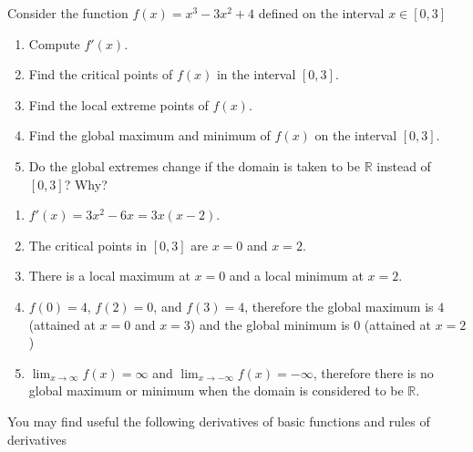 \documentclass[11pt]{exam}
\begin{document}
\begin{questions}


\question[4]
    Consider the function $f(x) = x^3 - 3x^2 + 4$ defined on the interval $x \in [0, 3]$
    \begin{enumerate}[leftmargin = 0.5cm, label = (\alph*), rightmargin = 0.2cm]
        \item Compute $f'(x)$.
        \item Find the critical points of $f(x)$ in the interval $[0, 3]$.
        \item Find the local extreme points of $f(x)$.
        \item Find the global maximum and minimum of $f(x)$ on the interval $[0, 3]$.
        \item Do the global extremes change if the domain is taken to be $\mathbb{R}$ instead of $[0, 3]$? Why?
    \end{enumerate}

\begin{solution}[0cm]
    \begin{enumerate}[leftmargin = 0.5cm, label = (\alph*), rightmargin = 0.2cm]
        \item $f'(x) = 3x^2 - 6x = 3x(x - 2)$.
        \item The critical points in $[0, 3]$ are $x = 0$ and $x = 2$.
        \item There is a local maximum at $x = 0$ and a local minimum at $x = 2$.
        \item $f(0) = 4$, $f(2) = 0$, and $f(3) = 4$, therefore the global maximum is $4$ (attained at $x = 0$ and $x = 3$) and the global minimum is $0$ (attained at $x = 2$)
        
        \item $\lim_{x\rightarrow\infty} f(x) = \infty$ and $\lim_{x\rightarrow-\infty} f(x) = -\infty$, therefore there is no global maximum or minimum when the domain is considered to be $\mathbb{R}$.
    \end{enumerate}
\end{solution}

\end{questions}	

\begin{center}
You may find useful the following derivatives of basic functions and rules of derivatives
\end{center}
\end{document}
